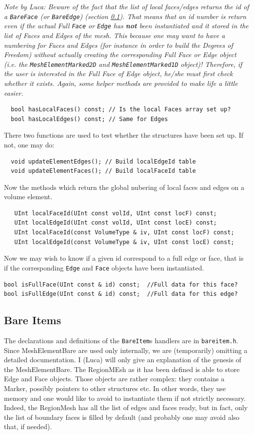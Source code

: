   \textsl{Note by Luca: Beware of the fact that the list of local
  faces/edges returns the id of a \texttt{BareFace} (or
  \texttt{BareEdge}) (section \ref{sec:bareentities}). That means that
  an id number is return even if the actual Full \texttt{Face} or
  \texttt{Edge} has \textbf{not} been instantiated and it stored in the
  list of Faces and Edges of the mesh.  This because one may want to
  have a numbering for Faces and Edges (for instance in order to build
  the Degrees of Freedom) without actually creating the corresponding
Full Face or Edge object (i.e. the \texttt{MeshElementMarked2D} and
\texttt{MeshElementMarked1D} object)! Therefore, if the user is interested in
the Full Face of Edge object, he/she must first check whether it exists.
Again, some helper methods are provided to make life a little easier.}

\begin{verbatim}
  bool hasLocalFaces() const; // Is the local Faces array set up?
  bool hasLocalEdges() const; // Same for Edges
\end{verbatim}
There two functions are used to test whether the structures have been set 
up. If not, one may do:
\begin{verbatim}
  void updateElementEdges(); // Build localEdgeId table
  void updateElementFaces(); // Build localFaceId table
\end{verbatim}
Now the methods which return the global nubering of
local faces and edges on a volume element.
\begin{verbatim}
   UInt localFaceId(UInt const volId, UInt const locF) const;
   UInt localEdgeId(UInt const volId, UInt const locE) const;
   UInt localFaceId(const VolumeType & iv, UInt const locF) const;
   UInt localEdgeId(const VolumeType & iv, UInt const locE) const;
\end{verbatim}
Now we may wish to know if a given id correspond to a full edge or
face, that is if the corresponding \texttt{Edge} and \texttt{Face}
objects have been instantiated. 

\begin{verbatim}
bool isFullFace(UInt const & id) const;  //Full data for this face?
bool isFullEdge(UInt const & id) const;  //Full data for this edge?
\end{verbatim}
\subsection{Bare Items}\label{sec:bareentities}
The declarations and definitions of the \texttt{BareItem}s handlers are in
\texttt{bareitem.h}. Since MeshElementBare are used only internally, we are
(temporarily) omitting a detailed documentation. I (Luca) will only
give an explanation of the genesis of the MeshElementBare. The RegionMEsh as
it has been defined is able to store Edge and Face objects. Those
objects are rather complex: they contains a Marker, possibly pointers
to other structures etc. In other words, they use memory and one would
like to avoid to instantiate them if not strictly necessary. Indeed,
the RegionMesh has all the list of edges and faces ready, but in fact,
only the list of boundary faces is filled by default (and probably one
may avoid also that, if needed). 

